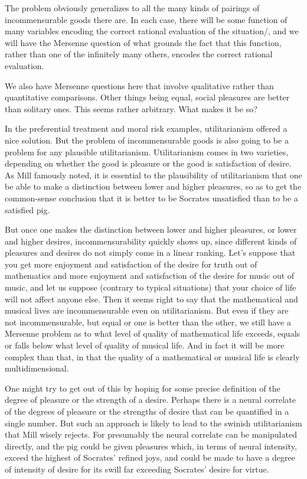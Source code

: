 The problem obviously generalizes to all the many kinds of pairings of incommensurable goods there are.  In each case, there 
will be some function of many variables encoding the correct rational evaluation of the situation/, and we will have the Mersenne
question of what grounds the fact that this function, rather than one of the infinitely many others, encodes the correct
rational evaluation.

We also have Mersenne questions here that involve qualitative rather than quantitative comparisons. Other things being equal,
social pleasures are better than solitary ones. This seems rather arbitrary. What makes it be so?
 
In the preferential treatment and moral risk examples, utilitarianism offered a nice solution. But the problem of incommensurable goods is
also going to be a problem for any plausible utilitarianism. Utilitarianism comes in two varieties, depending on whether
the good is pleasure or the good is satisfaction of desire. As Mill famously noted, it is essential to the plausibility
of utilitarianism that one be able to make a distinction between lower and higher pleasures, so as to get the common-sense
conclusion that it is better to be Socrates unsatisfied than to be a satisfied pig.

But once one makes the distinction between lower and higher pleasures, or lower and higher desires, incommensurability
quickly shows up, since different kinds of pleasures and desires do not simply come in a linear ranking. Let's suppose that you get more 
enjoyment and satisfaction of the desire for truth out of mathematics and more enjoyment and satisfaction of the desire for music out of music, and let us suppose (contrary to typical situations)
that your choice of life will not affect anyone else. Then it seems right to say that the mathematical and musical lives are
incommensurable even on utilitarianism. But even if they are not incommensurable, but equal or one is better than the other, 
we still have a Mersenne problem as to what level of quality of mathematical life exceeds, equals or falls below what level of 
quality of musical life. And in fact it will be more complex than that, in that the quality of a mathematical or musical life
is clearly multidimensional.

One might try to get out of this by hoping for some precise definition of the degree of pleasure or the strength of a desire.
Perhaps there is a neural correlate of the degrees of pleasure or the strengths of desire that can be quantified in a single
number. But such an approach is likely to lead to the swinish utilitarianism that Mill wisely rejects. For presumably the
neural correlate can be manipulated directly, and the pig could be given pleasures which, in terms of neural intensity,
exceed the highest of Socrates' refined joys, and could be made to have a degree of intensity of desire for its swill far
exceeding Socrates' desire for virtue.  

